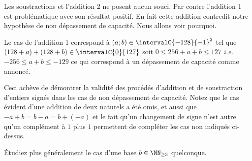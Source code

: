 \vspace{-1.5em}

Les soustractions et l'addition 2 ne posent aucun souci.
Par contre l'addition 1 est problématique avec son résultat positif. 
En fait cette addition contredit notre hypothèse de non dépassement de capacité. Nous allons voir pourquoi.

\medskip

Le cas de l'addition 1 correspond à $(a ; b) \in \intervalC{-128}{-1}^2$ tel que $(128 + a) + (128 + b) \in \intervalC{0}{127}$ soit $0 \leq 256 + a + b \leq 127$ \emph{i.e.} $-256 \leq a + b \leq -129$ ce qui correspond à un dépassement de capacité comme annoncé.
 
\medskip

Ceci achève de démontrer la validité des procédés d'addition et de soustraction d'entiers signés dans les cas de non dépassement de capacité.
Notez que le cas évident d'une addition de deux naturels a été omis, et aussi que $-a + b = b - a = b + (-a)$ et le fait qu'un changement de signe n'est autre qu'un complément à $1$ plus $1$ permettent de compléter les cas non indiqués ci-dessus.

\begin{exercise}
	Étudiez plus généralement le cas d'une base $b \in \NN_{\geq 3}$ quelconque.
\end{exercise}

